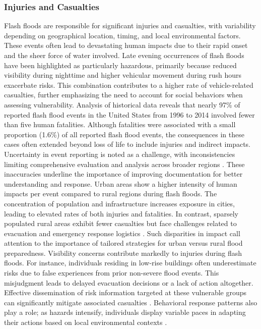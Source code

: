 \subsubsection{Injuries and Casualties}
Flash floods are responsible for significant injuries and casualties, with variability depending on geographical location, timing, and local environmental factors. These events often lead to devastating human impacts due to their rapid onset and the sheer force of water involved. Late evening occurrences of flash floods have been highlighted as particularly hazardous, primarily because reduced visibility during nighttime and higher vehicular movement during rush hours exacerbate risks. This combination contributes to a higher rate of vehicle-related casualties, further emphasizing the need to account for social behaviors when assessing vulnerability.
Analysis of historical data reveals that nearly 97\% of reported flash flood events in the United States from 1996 to 2014 involved fewer than five human fatalities. Although fatalities were associated with a small proportion (1.6\%) of all reported flash flood events, the consequences in these cases often extended beyond loss of life to include injuries and indirect impacts. Uncertainty in event reporting is noted as a challenge, with inconsistencies limiting comprehensive evaluation and analysis across broader regions \citep{Terti2017}. These inaccuracies underline the importance of improving documentation for better understanding and response.
Urban areas show a higher intensity of human impacts per event compared to rural regions during flash floods. The concentration of population and infrastructure increases exposure in cities, leading to elevated rates of both injuries and fatalities. In contrast, sparsely populated rural areas exhibit fewer casualties but face challenges related to evacuation and emergency response logistics \citep{Khajehei2020}. Such disparities in impact call attention to the importance of tailored strategies for urban versus rural flood preparedness.
Visibility concerns contribute markedly to injuries during flash floods. For instance, individuals residing in low-rise buildings often underestimate risks due to false experiences from prior non-severe flood events. This misjudgment leads to delayed evacuation decisions or a lack of action altogether. Effective dissemination of risk information targeted at these vulnerable groups can significantly mitigate associated casualties \citep{Zhang2024}. Behavioral response patterns also play a role; as hazards intensify, individuals display variable paces in adapting their actions based on local environmental contexts \citep{Borga2019}.

